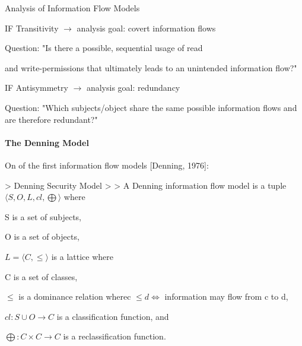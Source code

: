\documentclass[a4paper]{article}
\begin{document}
\begin{multicols}{3}
    Analysis of Information Flow Models
    \begin{itemize*}
        \item IF Transitivity $\rightarrow$ analysis goal: covert information flows
              \begin{itemize*}
                  \item Question: "Is there a possible, sequential usage of read\item and write-permissions that ultimately leads to an unintended information flow?"
              \end{itemize*}
        \item IF Antisymmetry $\rightarrow$ analysis goal: redundancy
              \begin{itemize*}
                  \item Question: "Which subjects/object share the same possible information flows and are therefore redundant?"
              \end{itemize*}
    \end{itemize*}

    \paragraph{The Denning Model}
    On of the first information flow models [Denning, 1976]:

    > Denning Security Model
    >
    > A Denning information flow model is a tuple $⟨S,O,L,cl,\bigoplus⟩$ where
    \begin{itemize*}
        \item S is a set of subjects,
        \item O is a set of objects,
        \item $L=⟨C,\leq⟩$ is a lattice where
              \begin{itemize*}
                  \item C is a set of classes,
                  \item $\leq$ is a dominance relation wherec $\leq d \Leftrightarrow$ information may flow from c to d,
              \end{itemize*}
        \item $cl:S\cup O\rightarrow C$ is a classification function, and
        \item $\bigoplus:C\times C\rightarrow C$ is a reclassification function.
    \end{itemize*}


\end{multicols}
\end{document}

